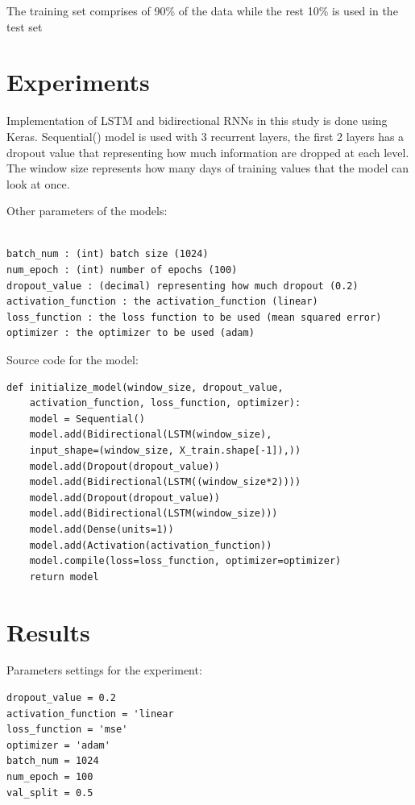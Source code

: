 \documentclass[a4paper,11pt]{article}
\begin{document}
The training set comprises of 90\% of the data while the rest 10\% is used in the test set



\section{Experiments}


Implementation of LSTM and bidirectional RNNs in this study is done using Keras. Sequential() model is used with 3 recurrent layers, the first 2 layers has a dropout value that representing how much information are dropped at each level. The window size represents how many days of training values that the model can look at once.

Other parameters of the models:
\begin{lstlisting}
 
batch_num : (int) batch size (1024)
num_epoch : (int) number of epochs (100)
dropout_value : (decimal) representing how much dropout (0.2)
activation_function : the activation_function (linear)
loss_function : the loss function to be used (mean squared error)
optimizer : the optimizer to be used (adam)
\end{lstlisting}

Source code for the model:
\begin{lstlisting}
def initialize_model(window_size, dropout_value, 
	activation_function, loss_function, optimizer):
	model = Sequential()
	model.add(Bidirectional(LSTM(window_size), 
	input_shape=(window_size, X_train.shape[-1]),))
	model.add(Dropout(dropout_value))
	model.add(Bidirectional(LSTM((window_size*2))))
	model.add(Dropout(dropout_value))
	model.add(Bidirectional(LSTM(window_size)))
	model.add(Dense(units=1))
	model.add(Activation(activation_function))
	model.compile(loss=loss_function, optimizer=optimizer)
	return model
\end{lstlisting}

\section{Results}

Parameters settings for the experiment:
\begin{lstlisting}
dropout_value = 0.2
activation_function = 'linear
loss_function = 'mse'
optimizer = 'adam'
batch_num = 1024
num_epoch = 100
val_split = 0.5
\end{lstlisting}
\end{document}
